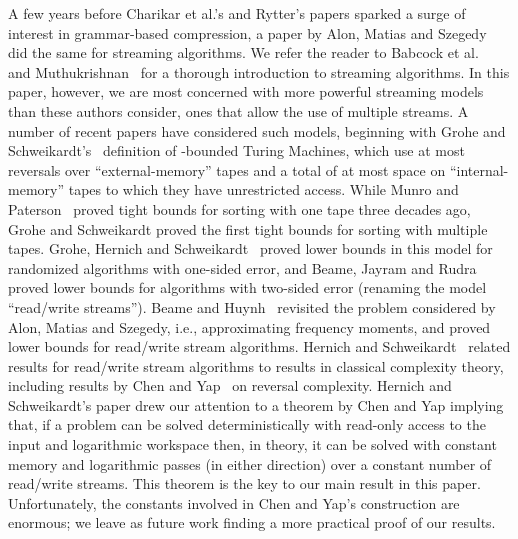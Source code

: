 \documentclass[runningheads]{llncs}
\begin{document}
A few years before Charikar et al.'s and Rytter's papers sparked a surge of interest in grammar-based compression, a paper by Alon, Matias and Szegedy~\cite{AMS99} did the same for streaming algorithms.  We refer the reader to Babcock et al.~\cite{BBDMW02} and Muthukrishnan~\cite{Mut05} for a thorough introduction to streaming algorithms.  In this paper, however, we are most concerned with more powerful streaming models than these authors consider, ones that allow the use of multiple streams.  A number of recent papers have considered such models, beginning with Grohe and Schweikardt's~\cite{GS05} definition of -bounded Turing Machines, which use at most  reversals over  ``external-memory'' tapes and a total of at most  space on ``internal-memory'' tapes to which they have unrestricted access.  While Munro and Paterson~\cite{MP80} proved tight bounds for sorting with one tape three decades ago, Grohe and Schweikardt proved the first tight bounds for sorting with multiple tapes.  Grohe, Hernich and Schweikardt~\cite{GHS09} proved lower bounds in this model for randomized algorithms with one-sided error, and Beame, Jayram and Rudra~\cite{BJR07} proved lower bounds for algorithms with two-sided error (renaming the model ``read/write streams'').  Beame and Huynh~\cite{BH08} revisited the problem considered by Alon, Matias and Szegedy, i.e., approximating frequency moments, and proved lower bounds for read/write stream algorithms.  Hernich and Schweikardt~\cite{HS08} related results for read/write stream algorithms to results in classical complexity theory, including results by Chen and Yap~\cite{CY91} on reversal complexity.  Hernich and Schweikardt's paper drew our attention to a theorem by Chen and Yap implying that, if a problem can be solved deterministically with read-only access to the input and logarithmic workspace then, in theory, it can be solved with constant memory and logarithmic passes (in either direction) over a constant number of read/write streams.  This theorem is the key to our main result in this paper.  Unfortunately, the constants involved in Chen and Yap's construction are enormous; we leave as future work finding a more practical proof of our results.
\end{document}
